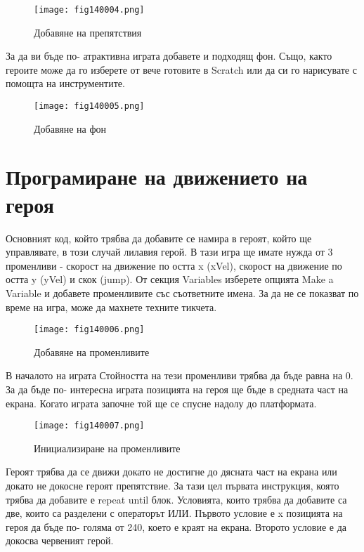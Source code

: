 \begin{figure}[H]
  \centering
  \texttt{[image: fig140004.png]}
  \caption{Добавяне на препятствия}
\label{fig140004}
\end{figure}

За да ви бъде по- атрактивна играта добавете и подходящ фон. Също, както героите може да го изберете от вече готовите в Scratch или да си го нарисувате с помощта на инструментите.

\begin{figure}[H]
  \centering
  \texttt{[image: fig140005.png]}
  \caption{Добавяне на фон}
\label{fig140005}
\end{figure}

\section{Програмиране на движението на героя}

Основният код, който трябва да добавите се намира в героят, който ще управлявате, в този случай лилавия герой. В тази игра ще имате нужда от 3 променливи - скорост на движение по остта x (xVel), скорост на движение по остта y (yVel) и скок (jump). От секция Variables изберете опцията Make a Variable и добавете променливите със съответните имена. За да не се показват по време на игра, може да махнете техните тикчета.

\begin{figure}[H]
  \centering
  \texttt{[image: fig140006.png]}
  \caption{Добавяне на променливите}
\label{fig140006}
\end{figure}

В началото на играта Стойността на тези променливи трябва да бъде равна на 0. За да бъде по- интересна играта позицията на героя ще бъде в средната част на екрана. Когато играта започне той ще се спусне надолу до платформата.

\begin{figure}[H]
  \centering
  \texttt{[image: fig140007.png]}
  \caption{Инициализиране на променливите}
\label{fig140007}
\end{figure}

Героят трябва да се движи докато не достигне до дясната част на екрана или докато не докосне героят препятствие. За тази цел първата инструкция, която трябва да добавите е repeat until блок. Условията, които трябва да добавите са две, които са разделени с операторът ИЛИ. Първото условие е x позицията на героя да бъде по- голяма от 240, което е краят на екрана. Второто условие е да докосва червеният герой.

